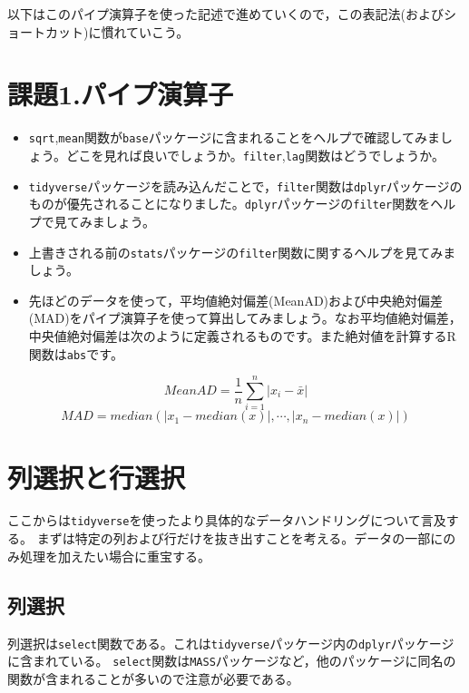 \documentclass[
  a4paper,
]{ltjsbook}
\providecommand{\tightlist}{%
  \setlength{\itemsep}{0pt}\setlength{\parskip}{0pt}}
\begin{document}
以下はこのパイプ演算子を使った記述で進めていくので，この表記法(およびショートカット)に慣れていこう。

\section{課題1.パイプ演算子}\label{ux8ab2ux984c1.ux30d1ux30a4ux30d7ux6f14ux7b97ux5b50}

\begin{itemize}
\tightlist
\item
  \texttt{sqrt},\texttt{mean}関数が\texttt{base}パッケージに含まれることをヘルプで確認してみましょう。どこを見れば良いでしょうか。\texttt{filter},\texttt{lag}関数はどうでしょうか。
\item
  \texttt{tidyverse}パッケージを読み込んだことで，\texttt{filter}関数は\texttt{dplyr}パッケージのものが優先されることになりました。\texttt{dplyr}パッケージの\texttt{filter}関数をヘルプで見てみましょう。
\item
  上書きされる前の\texttt{stats}パッケージの\texttt{filter}関数に関するヘルプを見てみましょう。
\item
  先ほどのデータを使って，平均値絶対偏差(MeanAD)および中央絶対偏差(MAD)をパイプ演算子を使って算出してみましょう。なお平均値絶対偏差，中央値絶対偏差は次のように定義されるものです。また絶対値を計算するR関数は\texttt{abs}です。
\end{itemize}

\[MeanAD = \frac{1}{n}\sum_{i=1}^n|x_i - \bar{x}|\]
\[MAD = median(|x_1-median(x)|,\cdots,|x_n-median(x)|)\]

\section{列選択と行選択}\label{ux5217ux9078ux629eux3068ux884cux9078ux629e}

ここからは\texttt{tidyverse}を使ったより具体的なデータハンドリングについて言及する。
まずは特定の列および行だけを抜き出すことを考える。データの一部にのみ処理を加えたい場合に重宝する。

\subsection{列選択}\label{ux5217ux9078ux629e}

列選択は\texttt{select}関数である。これは\texttt{tidyverse}パッケージ内の\texttt{dplyr}パッケージに含まれている。
\texttt{select}関数は\texttt{MASS}パッケージなど，他のパッケージに同名の関数が含まれることが多いので注意が必要である。
\end{document}
